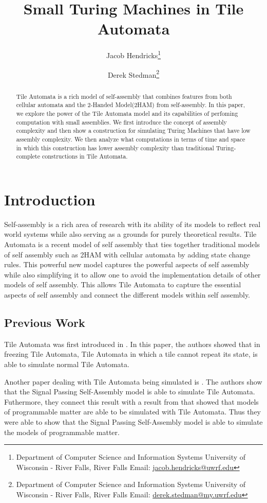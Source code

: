 \documentclass{article}
\title{Small Turing Machines in Tile Automata}
\author{
Jacob Hendricks\thanks{Department of Computer Science and Information Systems
University of Wisconsin - River Falls, River Falls
Email: \url{jacob.hendricks@uwrf.edu}}
\and
Derek Stedman\thanks{Department of Computer Science and Information Systems
University of Wisconsin - River Falls, River Falls
Email: \url{derek.stedman@my.uwrf.edu}}
}
\begin{document}
\maketitle

\begin{abstract}
  Tile Automata is a rich model of self-assembly that combines features from both cellular automata
  and the 2-Handed Model(2HAM) from self-assembly.  In this paper, we explore the power of the Tile Automata model and its capabilities of perfoming computation with small assemblies.  We first introduce the concept of assembly complexity and then show a construction for simulating Turing Machines that have low assembly complexity.  We then analyze what computations in terms of time and space in which this construction has lower assembly complexity than traditional Turing-complete constructions in Tile Automata.


  
\end{abstract}

\section{Introduction}
Self-assembly is a rich area of research with its ability of its models to reflect real world
systems while also serving as a grounds for purely theoretical results.
Tile Automata is a recent model of self assembly that ties together traditional models of self
assembly such as 2HAM with cellular automata by adding state change rules.  This powerful new
model captures the powerful aspects of self assembly while also simplifying it to allow one to
avoid the implementation details of other models of self assembly.  This allows Tile Automata to
capture the essential aspects of self assembly and connect the different models within self
assembly.

\subsection{Previous Work}
Tile Automata was first introduced in \cite{chalk2018freezing}.  In this paper, the authors showed
that in freezing Tile Automata, Tile Automata in which a tile cannot repeat its state, is able to
simulate normal Tile Automata.

Another paper dealing with Tile Automata being simulated is \cite{cantu2020signal}.  The authors
show that the Signal Passing Self-Assembly model is able to simulate Tile Automata.  Futhermore,
they connect this result with a result from \cite{alumbaugh2019simulation} that showed that models
of programmable matter are able to be simulated with Tile Automata.  Thus they were able to show
that the Signal Passing Self-Assembly model is able to simulate the models of programmable matter.
\end{document}
